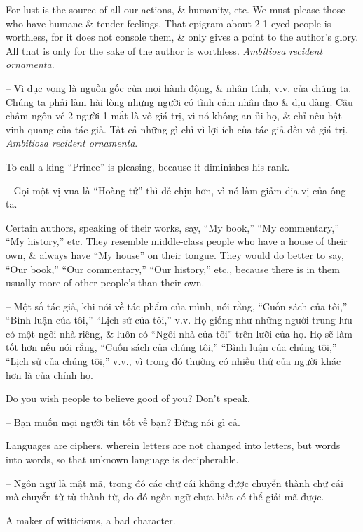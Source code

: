 \documentclass{article}
\begin{document}
\begin{enumerate}
\begin{itemize}
		For lust is the source of all our actions, \& humanity, etc. We must please those who have humane \& tender feelings. That epigram about 2 1-eyed people is worthless, for it does not console them, \& only gives a point to the author's glory. All that is only for the sake of the author is worthless. {\it Ambitiosa recident ornamenta}.
		
		-- Vì dục vọng là nguồn gốc của mọi hành động, \& nhân tính, v.v. của chúng ta. Chúng ta phải làm hài lòng những người có tình cảm nhân đạo \& dịu dàng. Câu châm ngôn về 2 người 1 mắt là vô giá trị, vì nó không an ủi họ, \& chỉ nêu bật vinh quang của tác giả. Tất cả những gì chỉ vì lợi ích của tác giả đều vô giá trị. {\it Ambitiosa recident ornamenta}.
		
		 To call a king ``Prince'' is pleasing, because it diminishes his rank.
		
		-- Gọi một vị vua là ``Hoàng tử'' thì dễ chịu hơn, vì nó làm giảm địa vị của ông ta.
		
		 Certain authors, speaking of their works, say, ``My book,'' ``My commentary,'' ``My history,'' etc. They resemble middle-class people who have a house of their own, \& always have ``My house'' on their tongue. They would do better to say, ``Our book,'' ``Our commentary,'' ``Our history,'' etc., because there is in them usually more of other people's than their own.
		
		-- Một số tác giả, khi nói về tác phẩm của mình, nói rằng, ``Cuốn sách của tôi,'' ``Bình luận của tôi,'' ``Lịch sử của tôi,'' v.v. Họ giống như những người trung lưu có một ngôi nhà riêng, \& luôn có ``Ngôi nhà của tôi'' trên lưỡi của họ. Họ sẽ làm tốt hơn nếu nói rằng, ``Cuốn sách của chúng tôi,'' ``Bình luận của chúng tôi,'' ``Lịch sử của chúng tôi,'' v.v., vì trong đó thường có nhiều thứ của người khác hơn là của chính họ.
		
		 Do you wish people to believe good of you? Don't speak.
		
		-- Bạn muốn mọi người tin tốt về bạn? Đừng nói gì cả.
		
		 Languages are ciphers, wherein letters are not changed into letters, but words into words, so that unknown language is decipherable.
		
		-- Ngôn ngữ là mật mã, trong đó các chữ cái không được chuyển thành chữ cái mà chuyển từ từ thành từ, do đó ngôn ngữ chưa biết có thể giải mã được.
		
		 A maker of witticisms, a bad character.
		

\end{itemize}
\end{enumerate}
\end{document}

